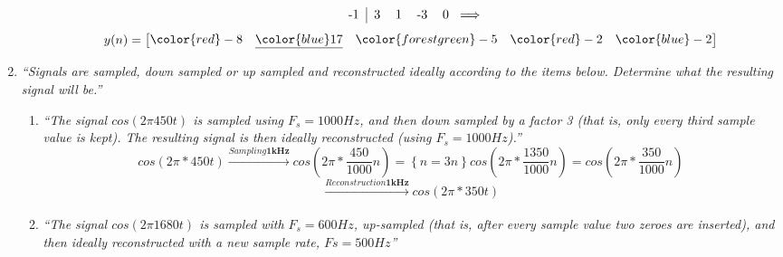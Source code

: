 \documentclass{article}
\begin{document}
\begin{enumerate}
\begin{enumerate}
\begin{displaymath}
\begin{tabular}{c|ccccc ccccc}
                        -1 & 3 & 1 & -3 & 0 \\
                    \end{tabular}
                    \Longrightarrow
                \end{displaymath}
                \begin{displaymath}
                    y(n)=
                    \begin{bmatrix}
                        \color{red}-8 & \underline{\color{blue}17} & \color{forestgreen}-5 & \color{red}-2 &\color{blue} -2
                    \end{bmatrix}
                \end{displaymath}
               
                
        \end{enumerate}

    \item %
        \emph{``Signals are sampled, down sampled or up sampled and reconstructed ideally according to the items below. Determine what the resulting signal will be.''}
        \begin{enumerate}
            \item %
                \emph{``The signal $cos(2\pi450t)$ is sampled using $F_s = 1000Hz$, and then down sampled by a
                        factor 3 (that is, only every third sample value is kept). The resulting signal is then
                        ideally reconstructed (using $F_s = 1000 Hz$).''}
                \\
                \begin{displaymath}
                    cos(2\pi*450t) \xrightarrow[]{Sampling \textbf{1kHz}} cos(2\pi*\frac{450}{1000}n) = 
                    \left\{ n=3n \right\} cos(2\pi*\frac{1350}{1000}n) = cos(2\pi*\frac{350}{1000}n)
                \end{displaymath}
                \begin{displaymath}
                    \xrightarrow[]{Reconstruction \textbf{1kHz}} cos(2\pi*350t) 
                \end{displaymath}

            \item %
                \emph{``The signal $cos(2\pi1680t)$ is sampled with $F_s = 600 Hz$, up-sampled (that is, after
                        every sample value two zeroes are inserted), and then ideally reconstructed with a
                        new sample rate, $Fs = 500 Hz$''}
                \\
        \end{enumerate}
    \end{enumerate}
\end{document}
